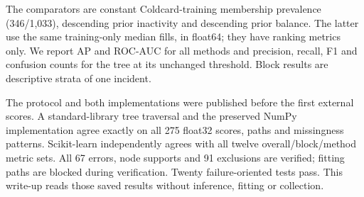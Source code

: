 The comparators are constant Coldcard-training membership prevalence
(346/1,033), descending prior inactivity and descending prior balance.
The latter use the same training-only median fills, in float64; they
have ranking metrics only. We report AP and ROC-AUC for all methods and
precision, recall, F1 and confusion counts for the tree at its unchanged
threshold. Block results are descriptive strata of one incident.

The protocol and both implementations were published before the first
external scores. A standard-library tree traversal and the preserved
NumPy implementation agree exactly on all 275 float32 scores, paths and
missingness patterns. Scikit-learn independently agrees with all twelve
overall/block/method metric sets. All 67 errors, node supports and 91
exclusions are verified; fitting paths are blocked during verification.
Twenty failure-oriented tests pass. This write-up reads those saved
results without inference, fitting or collection.

\endgroup
